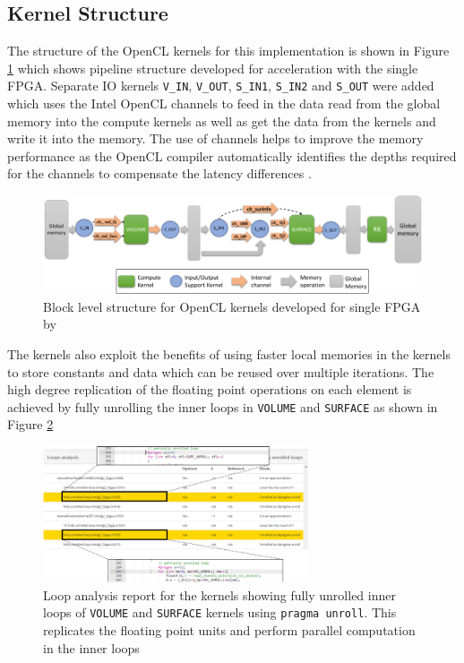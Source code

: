 \subsection{Kernel Structure}

The structure of the OpenCL kernels for this implementation is shown in Figure \ref{fig:singlefpga_kernstruc}
which shows pipeline structure developed for acceleration with the single FPGA.
Separate IO kernels \texttt{V\_IN}, \texttt{V\_OUT}, \texttt{S\_IN1}, \texttt{S\_IN2}
and \texttt{S\_OUT} were added which uses the Intel OpenCL channels to feed in the data
read from the global memory into the compute kernels as well as get the data from the
kernels and write it into the memory. The use of channels helps to improve the
memory performance as the OpenCL compiler automatically identifies the depths
required for the channels to compensate the latency differences \cite{kenter_opencl-based_2018}.
\begin{figure}[ht]%
    \centering
    \includegraphics[width=1.0\textwidth]{images/nb_kernstruc}
    \caption{Block level structure for OpenCL kernels developed for single FPGA by \textcite{kenter_opencl-based_2018}}
    \label{fig:singlefpga_kernstruc}
\end{figure}

The kernels also exploit the benefits of using faster local memories in the kernels
to store constants and data which can be reused over multiple iterations. The high
degree replication of the floating point operations on each element is achieved
by fully unrolling the inner loops in \texttt{VOLUME} and \texttt{SURFACE} as shown
in Figure \ref{fig:loop_report}
\begin{figure}[ht]%
    \centering
    \includegraphics[width=0.7\textwidth]{images/loop_report}
    \caption{Loop analysis report for the kernels showing fully unrolled inner
    loops of \texttt{VOLUME} and \texttt{SURFACE} kernels using \texttt{pragma unroll}.
    This replicates the floating point units and perform parallel computation in
    the inner loops}
    \label{fig:loop_report}
\end{figure}

